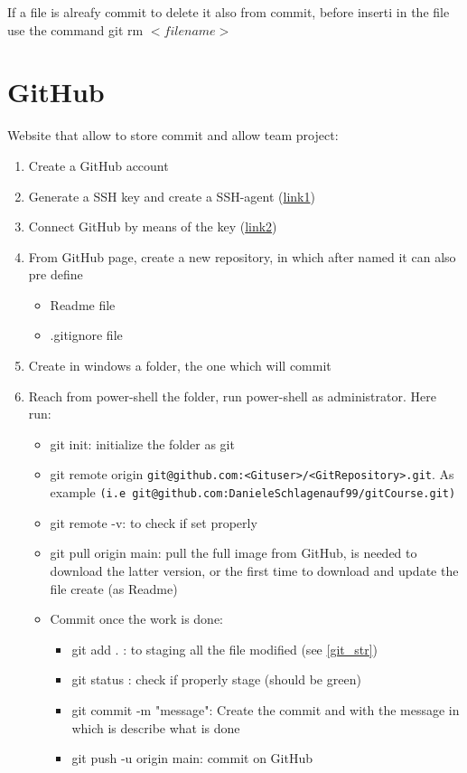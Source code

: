 \documentclass{report}
\begin{document}
If a file is alreafy commit to delete it also from commit, before inserti in the file use the command \newline
 git rm $<filename>$ 




\section{GitHub} \label{GitHub}
Website that allow to store commit and allow team project:
\begin{enumerate}
    \item Create a GitHub account 
    \item Generate a SSH key and create a SSH-agent (\href{https://docs.github.com/en/authentication/connecting-to-github-with-ssh/generating-a-new-ssh-key-and-adding-it-to-the-ssh-agent}{link1})
    \item Connect GitHub by means of the key (\href{https://docs.github.com/en/authentication/connecting-to-github-with-ssh/adding-a-new-ssh-key-to-your-github-account}{link2})
    \item From GitHub page, create a new repository, in which after named it can also pre define  
    \begin{itemize}
        \item Readme file
        \item .gitignore file
    \end{itemize}
    \item Create in windows a folder, the one which will commit 
    \item Reach from power-shell the folder, run power-shell as administrator. Here run:
    \begin{itemize}
        \item git init: initialize the folder as git 
        \item git remote origin \texttt{git@github.com:<Gituser>/<GitRepository>.git}. \newline As example \texttt{(i.e git@github.com:DanieleSchlagenauf99/gitCourse.git)}
        \item git remote -v: to check if set properly
        \item git pull origin main: pull the full image from GitHub, is needed to download the latter version, or the first time to download and update the file create (as Readme)
        \item Commit once the work is done:
        \begin{itemize}
            \item git add . : to staging all the file modified (see \autoref{git_str})
            \item git status : check if properly stage (should be green)
            \item git commit -m "message": Create the commit and with the message in which is describe what is done 
            \item git push -u origin main: commit on GitHub
        \end{itemize}
    \end{itemize}
\end{enumerate}
\end{document}

